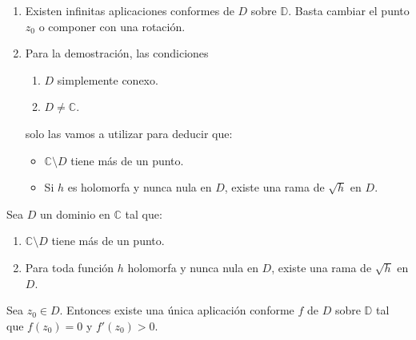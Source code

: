 \begin{remark}
    \hfill
    \begin{enumerate}
        \item Existen infinitas aplicaciones conformes de $D$ sobre $\mathbb{D}$.
              Basta cambiar el punto $z_0$ o componer con una rotación.
        \item Para la demostración, las condiciones
              \begin{enumerate}
                  \item $D$ simplemente conexo.
                  \item $D \neq \mathbb{C}$.
              \end{enumerate}
              solo las vamos a utilizar para deducir que:
              \begin{itemize}
                  \item $\mathbb{C} \setminus D$ tiene más de un punto.
                  \item Si $h$ es holomorfa y nunca nula en $D$, existe una rama de $\sqrt{h}$ en $D$.
              \end{itemize}
    \end{enumerate}
\end{remark}

\begin{theorem}
    Sea $D$ un dominio en $\mathbb{C}$ tal que:
    \begin{enumerate}
        \item $\mathbb{C} \setminus D$ tiene más de un punto.
        \item Para toda función $h$ holomorfa y nunca nula en $D$, existe una rama de $\sqrt{h}$ en $D$.
    \end{enumerate}
    Sea $z_0 \in D$.
    Entonces existe una única aplicación conforme $f$ de $D$ sobre $\mathbb{D}$ tal que $f(z_0) = 0$ y $f'(z_0) > 0$.
\end{theorem}


